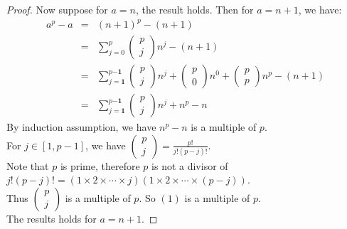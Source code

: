 \documentclass{article}
\theoremstyle{MyNonumberplain}
\theoremstyle{break}
\newtheorem*{proof}{Proof. }
\newcommand{\tmmathbf}[1]{\ensuremath{\boldsymbol{#1}}}
\theoremstyle{break}
\theoremstyle{break}
\theoremstyle{definition}
\theoremstyle{break}
\begin{document}
\begin{thmbox}
\begin{prfbox}
\begin{proof}
            Now suppose for $a = n$, the result holds. Then for $a = n + 1$, we have:
            \begin{eqnarray}
              a^p - a & = & (n + 1)^p - (n + 1)\nonumber\\
              & = & \sum^p_{j = 0} \left(\begin{array}{c}
                p\\
                j
              \end{array}\right) n^j - (n + 1)\nonumber\\
              & = & \sum^{p \tmmathbf{- 1}}_{j = \tmmathbf{1}} \left(\begin{array}{c}
                p\\
                j
              \end{array}\right) n^j + \left(\begin{array}{c}
                p\\
                0
              \end{array}\right) n^0 + \left(\begin{array}{c}
                p\\
                p
              \end{array}\right) n^p - (n + 1)\nonumber\\
              & = & \sum^{p \tmmathbf{- 1}}_{j = \tmmathbf{1}} \left(\begin{array}{c}
                p\\
                j
              \end{array}\right) n^j + n^p - n
            \end{eqnarray}
            By induction assumption, we have $n^p - n$ is a multiple of $p$.\\
            
            For $j \in [1, p - 1]$, we have $\left(\begin{array}{c}
              p\\
              j
            \end{array}\right) = \frac{p!}{j! (p - j) !}$.\\
            
            Note that $p$ is prime, therefore $p$ is not a divisor of $j! (p - j) ! = (1
            \times 2 \times \cdots \times j) (1 \times 2 \times \cdots \times (p - j))$.\\
            
            Thus $\left(\begin{array}{c}
              p\\
              j
            \end{array}\right)$ is a multiple of $p$. So $(1)$ is a multiple of $p$.\\
            
            The results holds for $a = n + 1$.
        \end{proof}
    \end{prfbox}
\end{thmbox}
\end{document}
